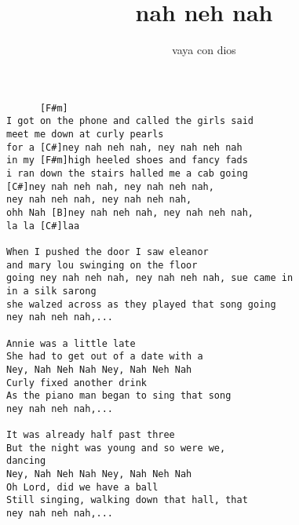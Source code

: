 \author{vaya con dios}
\title{nah neh nah}
\maketitle
\begin{verbatim}
      [F#m]
I got on the phone and called the girls said
meet me down at curly pearls
for a [C#]ney nah neh nah, ney nah neh nah
in my [F#m]high heeled shoes and fancy fads
i ran down the stairs halled me a cab going
[C#]ney nah neh nah, ney nah neh nah, 
ney nah neh nah, ney nah neh nah,
ohh Nah [B]ney nah neh nah, ney nah neh nah, 
la la [C#]laa

When I pushed the door I saw eleanor
and mary lou swinging on the floor
going ney nah neh nah, ney nah neh nah, sue came in
in a silk sarong
she walzed across as they played that song going 
ney nah neh nah,...

Annie was a little late 
She had to get out of a date with a 
Ney, Nah Neh Nah Ney, Nah Neh Nah
Curly fixed another drink 
As the piano man began to sing that song 
ney nah neh nah,...

It was already half past three 
But the night was young and so were we, 
dancing 
Ney, Nah Neh Nah Ney, Nah Neh Nah
Oh Lord, did we have a ball 
Still singing, walking down that hall, that
ney nah neh nah,...
\end{verbatim}